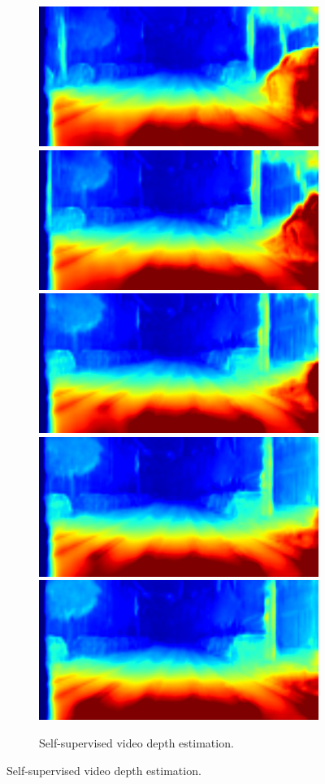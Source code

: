\begin{figure}[t]
\begin{subfigure}[t]{\linewidth}
\begin{center}
\includegraphics[width=0.19\linewidth]{seq/image_000086_000001_depth.png}
\includegraphics[width=0.19\linewidth]{seq/image_000086_000004_depth.png}
\includegraphics[width=0.19\linewidth]{seq/image_000086_000007_depth.png}
\includegraphics[width=0.19\linewidth]{seq/image_000086_000008_depth.png}
\includegraphics[width=0.19\linewidth]{seq/image_000086_000009_depth.png}
\vspace{-2mm}
  \caption{Self-supervised video depth estimation.}
\end{center}
\end{subfigure}


\end{figure}
